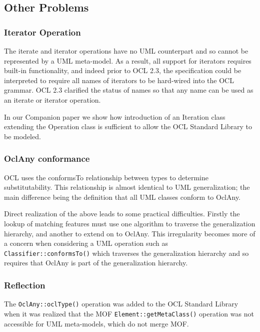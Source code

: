 \documentclass{eceasst}
\begin{document}
\subsection{Other Problems}

\subsubsection{Iterator Operation}

The iterate and iterator operations have no UML counterpart and so cannot be represented by a UML meta-model. As a result, all support for iterators requires built-in functionality, and indeed prior to OCL 2.3, the specification could be interpreted to require all names of iterators to be hard-wired into the OCL grammar. OCL 2.3 clarified the status of names so that any name can be used as an iterate or iterator operation.

In our Companion paper\cite{OCL-stdlib} we show how introduction of an Iteration class extending the Operation class is sufficient to allow the OCL Standard Library to be modeled.

\subsubsection{OclAny conformance}

OCL uses the conformsTo relationship between types to determine substitutability. This relationship is almost identical to UML generalization; the main difference being the definition that all UML classes conform to OclAny.

Direct realization of the above leads to some practical difficulties. Firstly the lookup of matching features must use one algorithm to traverse the generalization hierarchy, and another to extend on to OclAny. This irregularity becomes more of a concern when considering a UML operation such as \verb|Classifier::conformsTo()| which traverses the generalization hierarchy and so requires that OclAny is part of the generalization hierarchy.

\subsubsection{Reflection}

The \verb|OclAny::oclType()| operation was added to the OCL Standard Library when it was realized that the MOF \verb|Element::getMetaClass()| operation was not accessible for UML meta-models, which do not merge MOF.
\end{document}
